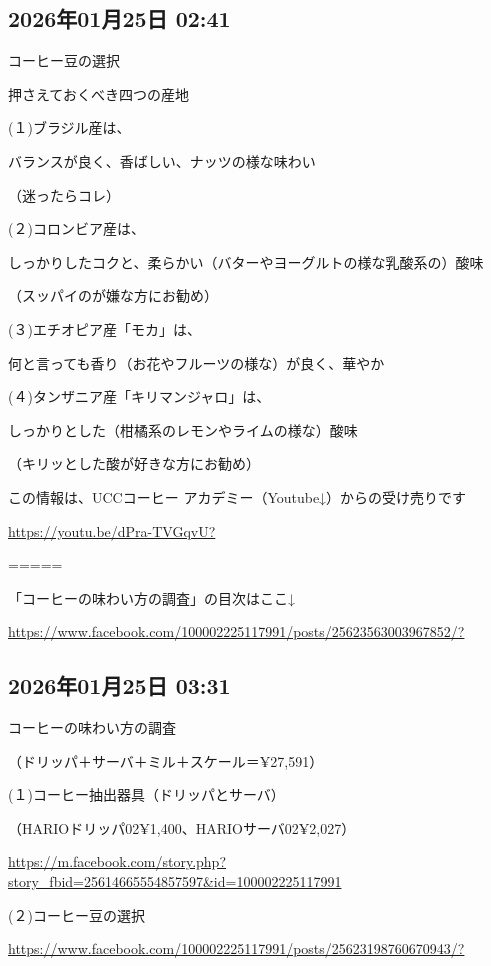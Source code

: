 \subsection*{2026年01月25日 02:41}

コーヒー豆の選択

押さえておくべき四つの産地

(１)ブラジル産は、

バランスが良く、香ばしい、ナッツの様な味わい

（迷ったらコレ）

(２)コロンビア産は、

しっかりしたコクと、柔らかい（バターやヨーグルトの様な乳酸系の）酸味

（スッパイのが嫌な方にお勧め）

(３)エチオピア産「モカ」は、

何と言っても香り（お花やフルーツの様な）が良く、華やか

(４)タンザニア産「キリマンジャロ」は、

しっかりとした（柑橘系のレモンやライムの様な）酸味

（キリッとした酸が好きな方にお勧め）

この情報は、UCCコーヒー アカデミー（Youtube↓）からの受け売りです

\url{https://youtu.be/dPra-TVGqvU?}

=====

「コーヒーの味わい方の調査」の目次はここ↓

\url{https://www.facebook.com/100002225117991/posts/25623563003967852/?}

\subsection*{2026年01月25日 03:31}

コーヒーの味わい方の調査

（ドリッパ＋サーバ＋ミル＋スケール＝¥27,591）

(１)コーヒー抽出器具（ドリッパとサーバ）

（HARIOドリッパ02¥1,400、HARIOサーバ02¥2,027）

\url{https://m.facebook.com/story.php?story_fbid=25614665554857597&id=100002225117991}

(２)コーヒー豆の選択

\url{https://www.facebook.com/100002225117991/posts/25623198760670943/?}

